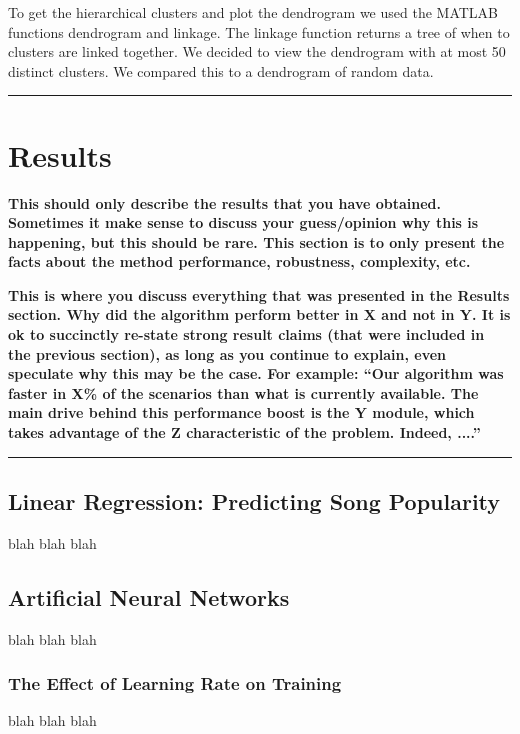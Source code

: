 \documentclass[12pt]{article}
\newcommand{\horizontalLine}{
	\begin{center}
		\hrule width 1.0\textwidth
	\end{center}
}
\newcommand{\smallHorizontalLine}{
    \begin{center}
        \hrule width 0.5\textwidth
    \end{center}}
\begin{document}
To get the hierarchical clusters and plot the dendrogram we used the MATLAB functions dendrogram and linkage. The linkage function returns a tree of when to clusters are linked together. We decided to view the dendrogram with at most 50 distinct clusters. We compared this to a dendrogram of random data.

\horizontalLine
\section{Results}
\label{sec:results}

\textbf{This should only describe the results that you have obtained. Sometimes it make sense
to discuss your guess/opinion why this is happening, but this should be rare. This section is to
only present the facts about the method performance, robustness, complexity, etc.}

\textbf{This is where you discuss everything that was presented in the Results section.
Why did the algorithm perform better in X and not in Y. It is ok to succinctly re-state strong
result claims (that were included in the previous section), as long as you continue to explain,
even speculate why this may be the case. For example: \textquotedblleft Our algorithm was faster in X\% of the
scenarios than what is currently available. The main drive behind this performance boost is the Y module, which takes advantage of the Z characteristic of the problem. Indeed, ....\textquotedblright}
\smallHorizontalLine

\subsection{Linear Regression: Predicting Song Popularity}
\label{subsec:linearRegressionResults}
blah blah blah

\subsection{Artificial Neural Networks}
\label{subsec:annResults}
blah blah blah

\subsubsection{The Effect of Learning Rate on Training}
\label{subsubsec:annLearningRateResults}
blah blah blah
\end{document}
